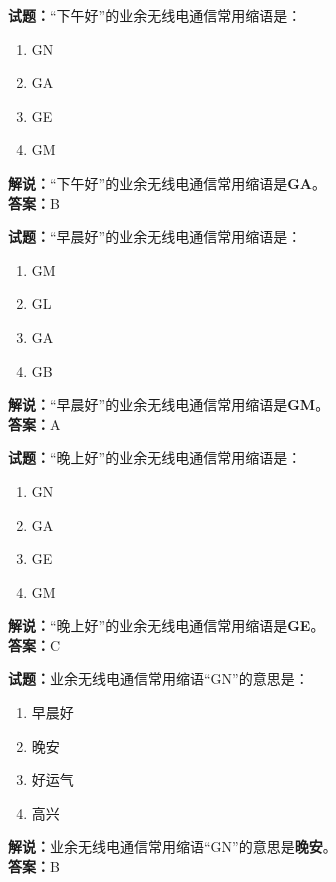 \documentclass{ctexbook}
\begin{document}
\vspace{1em}

\textbf{试题：}“下午好”的业余无线电通信常用缩语是：
\begin{enumerate}[leftmargin=3em]
  \item GN
  \item GA
  \item GE
  \item GM
\end{enumerate}
\noindent\textbf{解说：}“下午好”的业余无线电通信常用缩语是\textbf{GA}。\\\noindent\textbf{答案：}B

\vspace{1em}

\textbf{试题：}“早晨好”的业余无线电通信常用缩语是：
\begin{enumerate}[leftmargin=3em]
  \item GM
  \item GL
  \item GA
  \item GB
\end{enumerate}
\noindent\textbf{解说：}“早晨好”的业余无线电通信常用缩语是\textbf{GM}。\\\noindent\textbf{答案：}A

\vspace{1em}

\textbf{试题：}“晚上好”的业余无线电通信常用缩语是：
\begin{enumerate}[leftmargin=3em]
  \item GN
  \item GA
  \item GE
  \item GM
\end{enumerate}
\noindent\textbf{解说：}“晚上好”的业余无线电通信常用缩语是\textbf{GE}。\\\noindent\textbf{答案：}C

\vspace{1em}

\textbf{试题：}业余无线电通信常用缩语“GN”的意思是：
\begin{enumerate}[leftmargin=3em]
  \item 早晨好
  \item 晚安
  \item 好运气
  \item 高兴
\end{enumerate}
\noindent\textbf{解说：}业余无线电通信常用缩语“GN”的意思是\textbf{晚安}。\\\noindent\textbf{答案：}B
\end{document}
